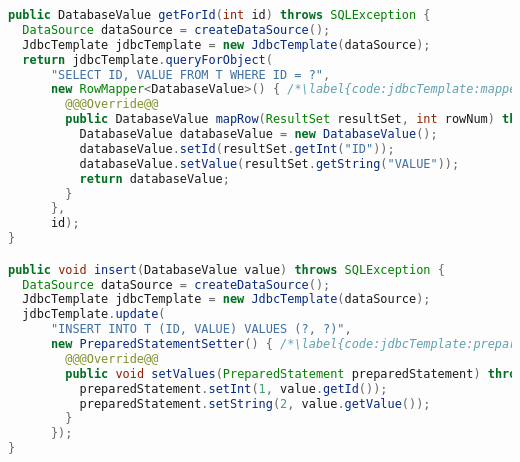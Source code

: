 
\begin{lstlisting}[language=Java, caption={Example of query and insert operations using \citet{SpringJDBC}}, label={code:jdbcTemplate}]
public DatabaseValue getForId(int id) throws SQLException {
  DataSource dataSource = createDataSource();
  JdbcTemplate jdbcTemplate = new JdbcTemplate(dataSource);
  return jdbcTemplate.queryForObject(
      "SELECT ID, VALUE FROM T WHERE ID = ?",
      new RowMapper<DatabaseValue>() { /*\label{code:jdbcTemplate:mapper}*/
        @@@Override@@
        public DatabaseValue mapRow(ResultSet resultSet, int rowNum) throws SQLException {
          DatabaseValue databaseValue = new DatabaseValue();
          databaseValue.setId(resultSet.getInt("ID"));
          databaseValue.setValue(resultSet.getString("VALUE"));
          return databaseValue;
        }
      },
      id);
}

public void insert(DatabaseValue value) throws SQLException {
  DataSource dataSource = createDataSource();
  JdbcTemplate jdbcTemplate = new JdbcTemplate(dataSource);
  jdbcTemplate.update(
      "INSERT INTO T (ID, VALUE) VALUES (?, ?)",
      new PreparedStatementSetter() { /*\label{code:jdbcTemplate:preparedStatementSetter}*/
        @@@Override@@
        public void setValues(PreparedStatement preparedStatement) throws SQLException {
          preparedStatement.setInt(1, value.getId());
          preparedStatement.setString(2, value.getValue());
        }
      });
}
\end{lstlisting}

